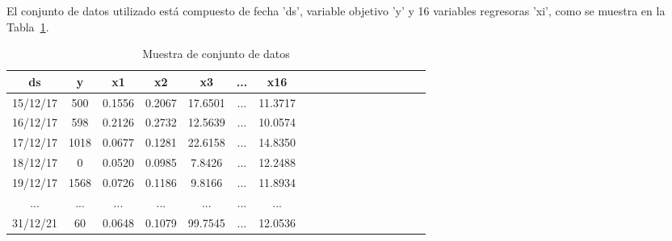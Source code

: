 El conjunto de datos utilizado está compuesto de fecha 'ds', variable objetivo 'y' y 16 variables regresoras 'xi', como se muestra en la Tabla~\ref{tab:datos}.
\begin{table}[htbp]
\centering
\caption{Muestra de conjunto de datos}
\label{tab:datos}
\begin{tabular}{cccccccccccccccccc}
\toprule
ds & y & x1 & x2 & x3 & ... & x16 \\
\midrule
15/12/17 & 500 & 0.1556 & 0.2067 & 17.6501 & ... & 11.3717 \\
16/12/17 & 598 & 0.2126 & 0.2732 & 12.5639 &  ... & 10.0574 \\
17/12/17 & 1018 & 0.0677 & 0.1281 & 22.6158 & ... & 14.8350 \\
18/12/17 & 0 & 0.0520 & 0.0985 & 7.8426 & ... & 12.2488 \\
19/12/17 & 1568 & 0.0726 & 0.1186 & 9.8166 & ... & 11.8934 \\
... & ... & ... & ... & ... & ... & ... \\
31/12/21 & 60 & 0.0648	& 0.1079 & 99.7545 & ... &	12.0536 \\
\bottomrule
\end{tabular}
\end{table}

